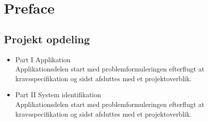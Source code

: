 \section*{Preface}

\subsection*{Projekt opdeling}
\begin{itemize}
\item Part I Applikation\\
Applikationsdelen start med problemformuleringen efterflugt at kravsspecifikation og sidst afsluttes med et projektoverblik.
\item Part II  System identifikation\\
Applikationsdelen start med problemformuleringen efterflugt at kravsspecifikation og sidst afsluttes med et projektoverblik.
\end{itemize}

